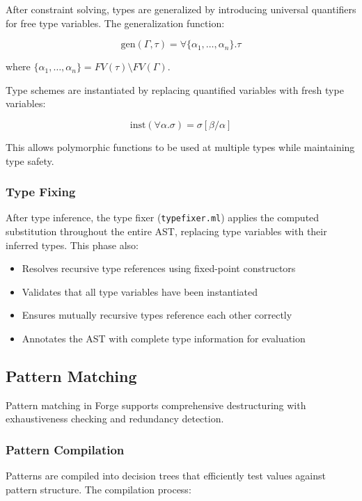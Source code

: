 \documentclass[conference,onecolumn]{IEEEtran}
\begin{document}
After constraint solving, types are generalized by introducing universal quantifiers for free type variables. The generalization function:

$$\text{gen}(\Gamma, \tau) = \forall \{\alpha_1, \ldots, \alpha_n\}.\tau$$

where $\{\alpha_1, \ldots, \alpha_n\} = FV(\tau) \setminus FV(\Gamma)$.

Type schemes are instantiated by replacing quantified variables with fresh type variables:

$$\text{inst}(\forall \alpha.\sigma) = \sigma[\beta/\alpha]$$

This allows polymorphic functions to be used at multiple types while maintaining type safety.

\subsubsection{Type Fixing}

After type inference, the type fixer (\texttt{typefixer.ml}) applies the computed substitution throughout the entire AST, replacing type variables with their inferred types. This phase also:

\begin{itemize}
\item Resolves recursive type references using fixed-point constructors
\item Validates that all type variables have been instantiated
\item Ensures mutually recursive types reference each other correctly
\item Annotates the AST with complete type information for evaluation
\end{itemize}

\subsection{Pattern Matching}

Pattern matching in Forge supports comprehensive destructuring with exhaustiveness checking and redundancy detection.

\subsubsection{Pattern Compilation}

Patterns are compiled into decision trees that efficiently test values against pattern structure. The compilation process:
\end{document}
